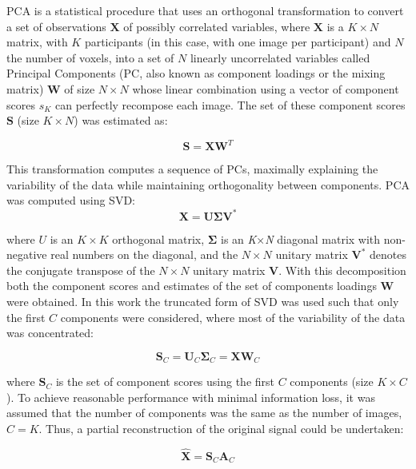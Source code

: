 \ac{PCA} is a statistical procedure that uses an orthogonal transformation to convert a set of observations $\mathbf{X}$ of possibly correlated variables, where $\mathbf{X}$ is a $K\times N$ matrix, with $K$ participants (in this case, with one image per participant) and $N$ the number of voxels, into a set of $N$ linearly uncorrelated variables called Principal Components (PC, also known as component loadings or the mixing matrix)  $\mathbf{W}$ of size $N\times N$ whose linear combination using a vector of component scores  ${s}_{K}$ can perfectly recompose each image. The set of these component scores  $\mathbf{S}$ (size $K \times N$) was estimated as:

\begin{equation}
	\mathbf{S}=\mathbf{X}\mathbf{W}^T
\end{equation}

This transformation computes a sequence of PCs, maximally explaining the
variability of the data while maintaining orthogonality between
components. \ac{PCA} was computed using \acf{SVD}:
\begin{equation}
	\mathbf{X} = \mathbf{U}\boldsymbol{\Sigma}\mathbf{V}^*
\end{equation}

where  $U$ is an $K\times K$ orthogonal matrix,  $\boldsymbol\Sigma$ is an \textit{K}×\textit{N} diagonal matrix with non-negative real numbers on the diagonal, and the $N\times N$ unitary matrix  $\mathbf{V}^*$ denotes the conjugate transpose of the $N\times N$ unitary matrix  $\mathbf{V}$. With this decomposition both the component scores and estimates of the set of components loadings  $\mathbf{W}$ were obtained. In this work the truncated form of \ac{SVD} was used such that only the first $C$ components were considered, where most of the variability of the data was concentrated:

\begin{equation}
	\mathbf{S}_C = \mathbf{U}_C \boldsymbol{\Sigma}_C = \mathbf{X}\mathbf{W}_C
\end{equation}

where  $\mathbf{S}_C$ is the set of component scores using the first $C$ components (size $K\times C$). To achieve reasonable performance with minimal information loss, it was assumed that the number of components was the same as the number of images, $C=K$. Thus, a partial reconstruction of the original signal could be undertaken:

\begin{equation}\label{eq:swpcareconst}
	\hat{\mathbf{X}}=\mathbf{S}_C \mathbf{A}_C
\end{equation}


